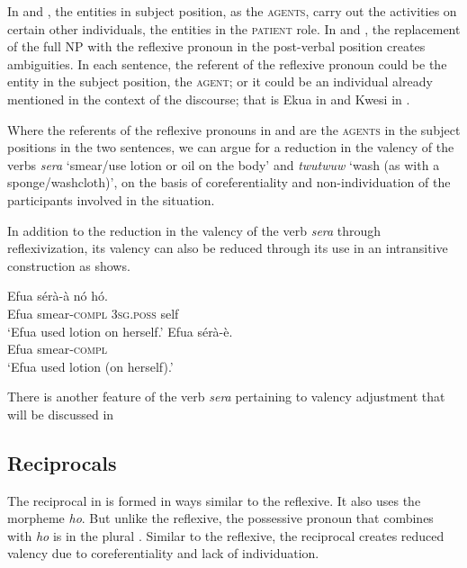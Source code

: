 \documentclass[output=paper]{langsci/langscibook}
\begin{document}
In  and , the entities in subject position, as the \textsc{agents}, carry out the activities on certain other individuals, the entities in the \textsc{patient} role. In  and , the replacement of the full NP with the reflexive pronoun in the post-verbal position creates ambiguities. In each sentence, the referent of the reflexive pronoun could be the entity in the subject position, the \textsc{agent}; or it could be an individual already mentioned in the context of the discourse; that is Ekua in  and Kwesi in .

Where the referents of the reflexive pronouns in  and  are the \textsc{agents} in the subject positions in the two sentences, we can argue for a reduction in the valency of the verbs \textit{sera} `smear/use lotion or oil on the body' and \textit{twutwuw} `wash (as with a sponge/washcloth)', on the basis of coreferentiality and non-individuation of the participants involved in the situation. 

In addition to the reduction in the valency of the verb \textit{sera} through reflexivization, its valency can also be reduced through its use in an intransitive construction as  shows.

\ea\label{ex:31.osam}
\ea\label{ex:31a.osam}
\gll  Efua  sérà-à    nó    hó.\\
       Efua  smear-\textsc{compl}  \textsc{3sg.poss}  self\\
\glt   `Efua used lotion on herself.'
\ex\label{ex:31b.osam}
\gll Efua  sérà-è.\\
       Efua  smear-\textsc{compl}\\
\glt   `Efua used lotion (on herself).'
\z 
\z 


There is another feature of the verb \textit{sera} pertaining to valency adjustment that will be discussed in 

\subsection{Reciprocals}\label{§4.2:reciprocals.osam}

The reciprocal in  is formed in ways similar to the reflexive. It also uses the morpheme \textit{ho}. But unlike the reflexive, the possessive pronoun that combines with \textit{ho} is in the plural . Similar to the reflexive, the reciprocal creates reduced valency due to coreferentiality and lack of individuation.
\end{document}
